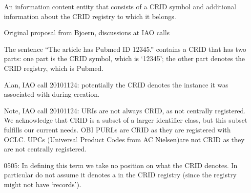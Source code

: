 \documentclass[letterpaper,10pt,english]{sphinxmanual}
\begin{document}
\begin{sphinxShadowBox}

\sphinxAtStartPar
An information content entity that consists of a CRID symbol and additional information about the CRID registry to which it belongs.
\end{sphinxShadowBox}

\begin{sphinxShadowBox}

\sphinxAtStartPar
Original proposal from Bjoern, discussions at IAO calls
\end{sphinxShadowBox}

\begin{sphinxShadowBox}

\sphinxAtStartPar
The sentence “The article has Pubmed ID 12345.” contains a CRID that has two parts: one part is the CRID symbol, which is ‘12345’; the other part denotes the CRID registry, which is Pubmed.
\end{sphinxShadowBox}

\begin{sphinxShadowBox}

\sphinxAtStartPar
Alan, IAO call 20101124: potentially the CRID denotes the instance it was associated with during creation.

\sphinxAtStartPar
Note, IAO call 20101124: URIs are not always CRID, as not centrally registered. We acknowledge that CRID is a subset of a larger identifier class, but this subset fulfills our current needs. OBI PURLs are CRID as they are registered with OCLC. UPCs (Universal Product Codes from AC Nielsen)are not CRID as they are not centrally registered.

\sphinxhyphen{}05\sphinxhyphen{}05: In defining this term we take no position on what the CRID denotes. In particular do not assume it denotes a  in the CRID registry (since the registry might not have ‘records’).
\end{sphinxShadowBox}

\begin{sphinxShadowBox}

\sphinxAtStartPar
{}
\end{sphinxShadowBox}
\end{document}
